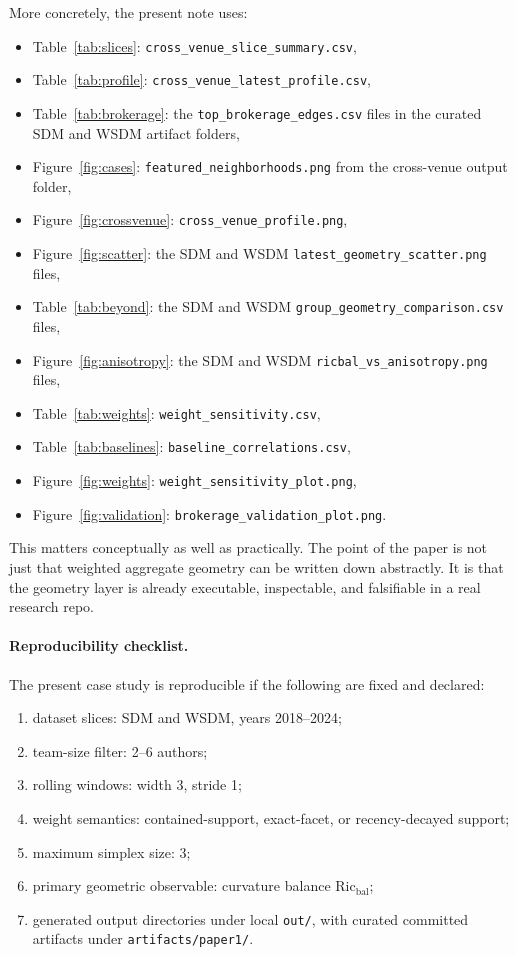 \documentclass[11pt]{article}
\newcommand{\Ric}{\mathrm{Ric}}
\begin{document}
More concretely, the present note uses:
\begin{itemize}
    \item Table~\ref{tab:slices}: \texttt{cross\_venue\_slice\_summary.csv},
    \item Table~\ref{tab:profile}: \texttt{cross\_venue\_latest\_profile.csv},
    \item Table~\ref{tab:brokerage}: the \texttt{top\_brokerage\_edges.csv} files in the curated SDM and WSDM artifact folders,
    \item Figure~\ref{fig:cases}: \texttt{featured\_neighborhoods.png} from the cross-venue output folder,
    \item Figure~\ref{fig:crossvenue}: \texttt{cross\_venue\_profile.png},
    \item Figure~\ref{fig:scatter}: the SDM and WSDM \texttt{latest\_geometry\_scatter.png} files,
    \item Table~\ref{tab:beyond}: the SDM and WSDM \texttt{group\_geometry\_comparison.csv} files,
    \item Figure~\ref{fig:anisotropy}: the SDM and WSDM \texttt{ricbal\_vs\_anisotropy.png} files,
    \item Table~\ref{tab:weights}: \texttt{weight\_sensitivity.csv},
    \item Table~\ref{tab:baselines}: \texttt{baseline\_correlations.csv},
    \item Figure~\ref{fig:weights}: \texttt{weight\_sensitivity\_plot.png},
    \item Figure~\ref{fig:validation}: \texttt{brokerage\_validation\_plot.png}.
\end{itemize}

This matters conceptually as well as practically. The point of the paper is not
just that weighted aggregate geometry can be written down abstractly. It is that
the geometry layer is already executable, inspectable, and falsifiable in a real
research repo.

\paragraph{Reproducibility checklist.}
The present case study is reproducible if the following are fixed and declared:
\begin{enumerate}[label=(\alph*)]
    \item dataset slices: SDM and WSDM, years 2018--2024;
    \item team-size filter: 2--6 authors;
    \item rolling windows: width 3, stride 1;
    \item weight semantics: contained-support, exact-facet, or recency-decayed support;
    \item maximum simplex size: 3;
    \item primary geometric observable: curvature balance $\Ric_{\mathrm{bal}}$;
    \item generated output directories under local \texttt{out/}, with curated committed artifacts under \texttt{artifacts/paper1/}.
\end{enumerate}
\end{document}
